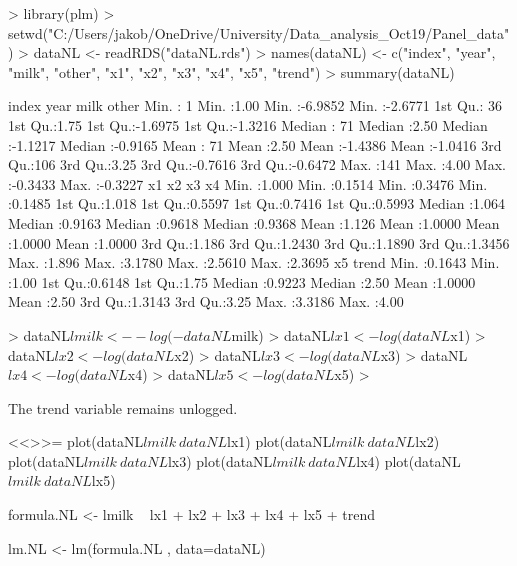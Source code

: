 \documentclass{article}
\begin{document}
\begin{Schunk}
\begin{Sinput}
> library(plm)
> setwd("C:/Users/jakob/OneDrive/University/Data_analysis_Oct19/Panel_data")
> dataNL <- readRDS("dataNL.rds")
> names(dataNL) <-   c("index", "year", "milk", "other", "x1", "x2", "x3", "x4", "x5", "trend")
> summary(dataNL)          
\end{Sinput}
\begin{Soutput}
     index          year           milk             other        
 Min.   :  1   Min.   :1.00   Min.   :-6.9852   Min.   :-2.6771  
 1st Qu.: 36   1st Qu.:1.75   1st Qu.:-1.6975   1st Qu.:-1.3216  
 Median : 71   Median :2.50   Median :-1.1217   Median :-0.9165  
 Mean   : 71   Mean   :2.50   Mean   :-1.4386   Mean   :-1.0416  
 3rd Qu.:106   3rd Qu.:3.25   3rd Qu.:-0.7616   3rd Qu.:-0.6472  
 Max.   :141   Max.   :4.00   Max.   :-0.3433   Max.   :-0.3227  
       x1              x2               x3               x4        
 Min.   :1.000   Min.   :0.1514   Min.   :0.3476   Min.   :0.1485  
 1st Qu.:1.018   1st Qu.:0.5597   1st Qu.:0.7416   1st Qu.:0.5993  
 Median :1.064   Median :0.9163   Median :0.9618   Median :0.9368  
 Mean   :1.126   Mean   :1.0000   Mean   :1.0000   Mean   :1.0000  
 3rd Qu.:1.186   3rd Qu.:1.2430   3rd Qu.:1.1890   3rd Qu.:1.3456  
 Max.   :1.896   Max.   :3.1780   Max.   :2.5610   Max.   :2.3695  
       x5             trend     
 Min.   :0.1643   Min.   :1.00  
 1st Qu.:0.6148   1st Qu.:1.75  
 Median :0.9223   Median :2.50  
 Mean   :1.0000   Mean   :2.50  
 3rd Qu.:1.3143   3rd Qu.:3.25  
 Max.   :3.3186   Max.   :4.00  
\end{Soutput}
\begin{Sinput}
> dataNL$lmilk <- -log(-dataNL$milk)
> dataNL$lx1 <- log(dataNL$x1)
> dataNL$lx2 <- log(dataNL$x2)
> dataNL$lx3 <- log(dataNL$x3)
> dataNL$lx4 <- log(dataNL$x4)
> dataNL$lx5 <- log(dataNL$x5)
>             
\end{Sinput}
\end{Schunk}
            The trend variable remains unlogged.
            
                <<>>=
            plot(dataNL$lmilk~dataNL$lx1)
            plot(dataNL$lmilk~dataNL$lx2)
            plot(dataNL$lmilk~dataNL$lx3)
            plot(dataNL$lmilk~dataNL$lx4)
            plot(dataNL$lmilk~dataNL$lx5)

            formula.NL <- lmilk ~ lx1 + lx2 + lx3 + lx4 + lx5 + trend
            
            lm.NL <- lm(formula.NL , data=dataNL)
                
\end{document}
